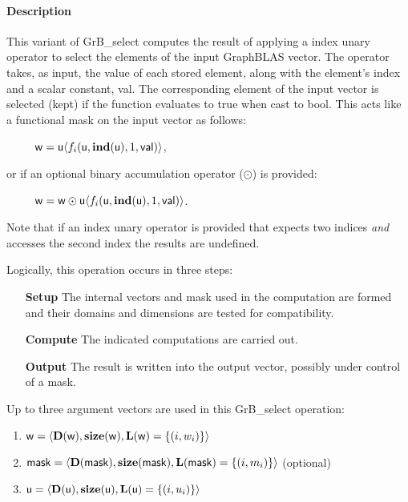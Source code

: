 \paragraph{Description}

{\color{red}
This variant of {\sf GrB\_select} computes the result of applying a index unary operator
to select the elements of the input GraphBLAS vector.  The operator takes, as input,
the value of each stored element, along with the element's index and a scalar 
constant, {\sf val}.  The corresponding element of the input vector is selected (kept)
if the function evaluates to {\sf true} when cast to {\sf bool}.  This acts like a
functional mask on the input vector as follows:
\begin{itemize}[leftmargin=2.1in]
\item[~] ${\sf w} = {\sf u}\langle f_i({\sf u}, \bold{ind}({\sf u}), 1, {\sf val})\rangle$,
\end{itemize}
or if an optional binary accumulation operator ($\odot$) is provided:
\begin{itemize}[leftmargin=2.1in]
\item[~] ${\sf w} = {\sf w} \odot {\sf u}\langle f_i({\sf u}, \bold{ind}({\sf u}), 1, {\sf val})\rangle$.  
\end{itemize}
Note that if an index unary operator is provided that expects two indices {\it and} 
accesses the second index the results are undefined.}

Logically, this operation occurs in three steps:
\begin{enumerate}[leftmargin=0.75in]
\item[\bf Setup] The internal vectors and mask used in the computation are formed 
and their domains and dimensions are tested for compatibility.
\item[\bf Compute] The indicated computations are carried out.
\item[\bf Output] The result is written into the output vector, possibly under 
control of a mask.
\end{enumerate}

Up to three argument vectors are used in this {\sf GrB\_select} operation:
\begin{enumerate}
    \item ${\sf w} = \langle \bold{D}({\sf w}),\bold{size}({\sf w}),
    \bold{L}({\sf w}) = \{(i,w_i) \} \rangle$

    \item ${\sf mask} = \langle \bold{D}({\sf mask}),\bold{size}({\sf mask}),
    \bold{L}({\sf mask}) = \{(i,m_i) \} \rangle$ (optional)

    \item ${\sf u} = \langle \bold{D}({\sf u}),\bold{size}({\sf u}),
    \bold{L}({\sf u}) = \{(i,u_i) \} \rangle$
\end{enumerate}

